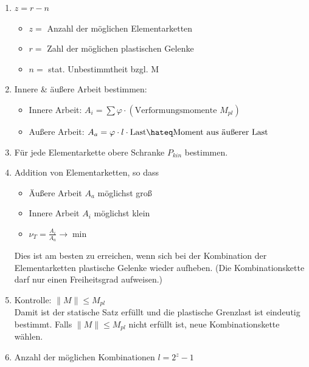 \documentclass[fleqn,twoside]{article}
\begin{document}
\begin{enumerate}
            \item $z=r-n$
                \begin{itemize}
                    \item $z=$ Anzahl der möglichen Elementarketten
                    \item $r=$ Zahl der möglichen plastischen Gelenke
                    \item $n=$ stat. Unbestimmtheit bzgl. M
                \end{itemize}
            \item Innere \& äußere Arbeit bestimmen:
                \begin{itemize}
                    \item Innere Arbeit: $A_i = \sum \varphi \cdot (\text{Verformungsmomente } M_{pl}) $
                    \item Außere Arbeit: $A_a = \varphi \cdot l \cdot \text{Last} \hateq \text{Moment aus äußerer Last}$ 
                \end{itemize}
            \item Für jede Elementarkette obere Schranke $P_{k i n}$ bestimmen.
            \item Addition von Elementarketten, so dass
                \begin{itemize}  \item Äußere Arbeit $A_a$ möglichst groß \item Innere Arbeit $A_i$ möglichst klein \item $\nu_T=\frac{A_i}{A_a} \rightarrow \min$ \end{itemize}
                Dies ist am besten zu erreichen, wenn sich bei der Kombination der Elementarketten plastische Gelenke wieder aufheben. (Die Kombinationskette darf nur einen Freiheitsgrad aufweisen.)
            \item Kontrolle: $\|M\| \leq M_{p l}$\\
                Damit ist der statische Satz erfüllt und die plastische Grenzlast ist eindeutig bestimmt. Falls $\|M\| \leq M_{p l}$ nicht erfüllt ist, neue Kombinationskette wählen.
            \item Anzahl der möglichen Kombinationen $l=2^z-1$
        \end{enumerate}
\end{document}
